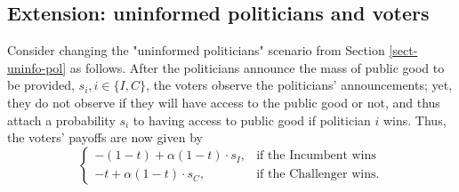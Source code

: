 \documentclass[12pt,english]{article}
\begin{document}
\subsection{Extension: uninformed politicians and voters} \label{app-extension}

Consider changing the "uninformed politicians" scenario from Section \ref{sect-uninfo-pol} as follows. After the politicians announce the mass of public good to be provided,  $s_i, i\in\{I,C\}$, the voters observe the politicians' announcements; yet, they do not observe if they will have access to the public good or not, and thus attach a probability $s_i$ to having access to public good if politician $i$ wins. Thus, the voters' payoffs are now given by
\begin{equation*}
\begin{cases}
		-(1-t) + \alpha (1 - t) \cdot s_I, & \text{if the Incumbent wins}\\
         -t + \alpha (1 - t) \cdot s_C , & \text{if the Challenger wins.}
		 \end{cases}
\end{equation*}
\end{document}
